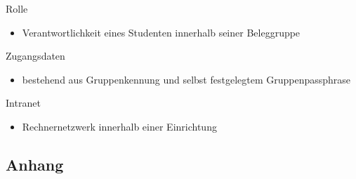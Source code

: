 \documentclass{article}
\begin{document}
Rolle
\begin{itemize} 
\item Verantwortlichkeit eines Studenten innerhalb seiner Beleggruppe
\end{itemize}

Zugangsdaten
\begin{itemize} 
\item bestehend aus Gruppenkennung und selbst festgelegtem Gruppenpassphrase
\end{itemize}

Intranet
\begin{itemize} 
\item Rechnernetzwerk innerhalb einer Einrichtung
\end{itemize}
\subsection{Anhang}
\end{document}
